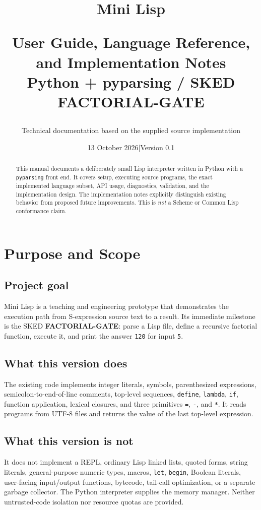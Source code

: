 \documentclass[11pt,a4paper,oneside]{report}
\title{\textbf{Mini Lisp}\par User Guide, Language Reference, and Implementation Notes\\[1em]\large Python + pyparsing / SKED FACTORIAL-GATE}
\author{Technical documentation based on the supplied source implementation}
\date{13 October 2026\quad |\quad Version 0.1}
\begin{document}
\maketitle
\begin{abstract}
This manual documents a deliberately small Lisp interpreter written in Python with a \texttt{pyparsing} front end. It covers setup, executing source programs, the exact implemented language subset, API usage, diagnostics, validation, and the implementation design. The implementation notes explicitly distinguish existing behavior from proposed future improvements. This is \emph{not} a Scheme or Common Lisp conformance claim.
\end{abstract}
\tableofcontents\clearpage
\chapter{Purpose and Scope}
\section{Project goal}
Mini Lisp is a teaching and engineering prototype that demonstrates the execution path from S-expression source text to a result. Its immediate milestone is the SKED \textbf{FACTORIAL-GATE}: parse a Lisp file, define a recursive factorial function, execute it, and print the answer \texttt{120} for input \texttt{5}.
\section{What this version does}
The existing code implements integer literals, symbols, parenthesized expressions, semicolon-to-end-of-line comments, top-level sequences, \texttt{define}, \texttt{lambda}, \texttt{if}, function application, lexical closures, and three primitives \texttt{=}, \texttt{-}, and \texttt{*}. It reads programs from UTF-8 files and returns the value of the last top-level expression.
\section{What this version is not}
It does not implement a REPL, ordinary Lisp linked lists, quoted forms, string literals, general-purpose numeric types, macros, \texttt{let}, \texttt{begin}, Boolean literals, user-facing input/output functions, bytecode, tail-call optimization, or a separate garbage collector. The Python interpreter supplies the memory manager. Neither untrusted-code isolation nor resource quotas are provided.
\end{document}
